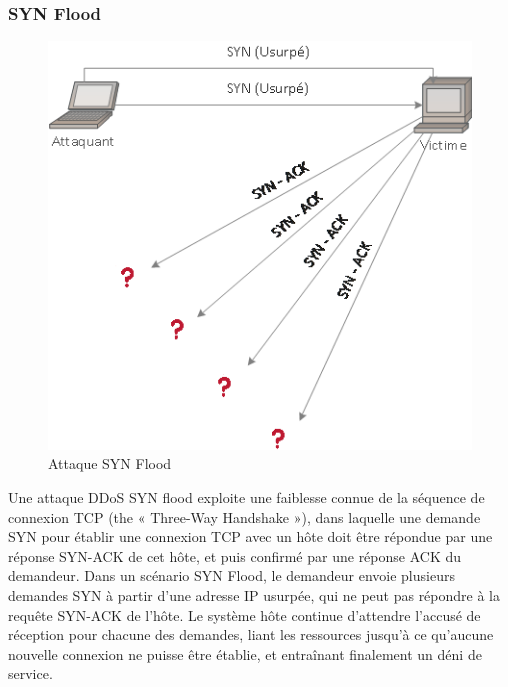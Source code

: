 	\subsubsection{SYN Flood}
	\begin{figure}[h]
		\begin{center}
			\includegraphics[width=\textwidth]{IMAGES/ORIGINALS/Attaque_SYN_Flood}
		\end{center}
		\caption{Attaque SYN Flood}
	\end{figure}
	
	Une attaque DDoS SYN flood exploite une faiblesse connue de la séquence de connexion TCP (the « Three-Way Handshake »), dans laquelle une demande SYN pour établir une connexion TCP avec un hôte doit être répondue par une réponse SYN-ACK de cet hôte, et puis confirmé par une réponse ACK du demandeur. Dans un scénario SYN Flood, le demandeur envoie plusieurs demandes SYN à partir d'une adresse IP usurpée, qui ne peut pas répondre à la requête SYN-ACK de l'hôte. Le système hôte continue d'attendre l'accusé de réception pour chacune des demandes, liant les ressources jusqu'à ce qu'aucune nouvelle connexion ne puisse être établie, et entraînant finalement un déni de service.

